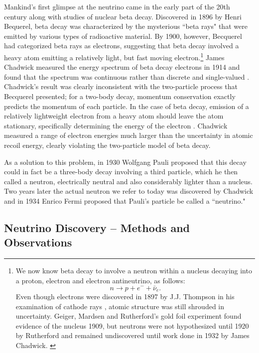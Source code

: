 Mankind's first glimpse at the neutrino came in the early part of the 20th century along with studies of nuclear beta decay.  Discovered in 1896 by Henri Bequerel, beta decay was characterized by the mysterious ``beta rays" that were emitted by various types of radioactive material.  \cite{becquerelBeta}  By 1900, however, Becquerel had categorized beta rays as electrons, suggesting that beta decay involved a heavy atom emitting a relatively light, but fast moving electron.\footnote{
We now know beta decay to involve a neutron within a nucleus decaying into a proton, electron and electron antineutrino, as follows: 
\begin{equation*}      n \rightarrow p + e^- + \bar{\nu}_e  . \end{equation*}
Even though electrons were discovered in 1897 by J.J. Thompson in his examination of cathode rays \cite{thompson}, atomic structure was still shrouded in uncertainty.  Geiger, Mardsen and Rutherford's gold foil experiment found evidence of the nucleus 1909, but neutrons were not hypothesized until 1920 by Rutherford \cite{rutherfordNeutron} and remained undiscovered until work done in 1932 by James Chadwick. \cite{chadwickNeutron}
 } \cite{becquerelElec}  
James Chadwick measured the energy spectrum of beta decay electrons in 1914 and found that the spectrum was continuous rather than discrete and single-valued \cite {chadwickBeta}.  Chadwick's result was clearly inconsistent with the two-particle process that Becquerel presented; for a two-body decay, momentum conservation exactly predicts the momentum of each particle.  In the case of beta decay, emission of a relatively lightweight electron from a heavy atom should leave the atom stationary, specifically determining the energy of the electron .  Chadwick measured a range of electron energies much larger than the uncertainty in atomic recoil energy, clearly violating the two-particle model of beta decay.  

As a solution to this problem, in 1930 Wolfgang Pauli proposed that this decay could in fact be a three-body decay involving a third particle, which he then called a neutron, electrically neutral and also considerably lighter than a nucleus. \cite{pauliNeuProp}  Two years later the actual neutron we refer to today was discovered by Chadwick \cite{chadwickNeutron} and in 1934 Enrico Fermi proposed that Pauli's particle be called a ``neutrino." \cite{fermiNeuName} 

\subsection{Neutrino Discovery -- Methods and Observations}
\label{discovery}


